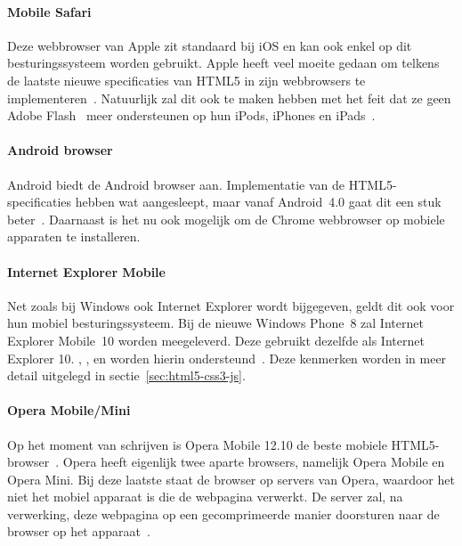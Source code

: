 \paragraph{Mobile Safari}
\label{sec:mobile-safari}
Deze webbrowser van Apple zit standaard bij iOS en kan ook enkel op dit besturingssysteem worden gebruikt. 
Apple heeft veel moeite gedaan om telkens de laatste nieuwe specificaties van HTML5 in zijn webbrowsers te implementeren~\cite{Hales2012}. 
Natuurlijk zal dit ook te maken hebben met het feit dat ze geen Adobe Flash~\cite{Adobe2013} meer ondersteunen op hun iPods, iPhones en iPads~\cite{Jobs2010}.

\paragraph{Android browser}
\label{sec:android-browser}
Android biedt de Android browser aan. 
Implementatie van de HTML5-specificaties hebben wat aangesleept, maar vanaf Android~4.0 gaat dit een stuk beter~\cite{Hales2012}. 
Daarnaast is het nu ook mogelijk om de Chrome webbrowser op mobiele apparaten te installeren.

\paragraph{Internet Explorer Mobile}
Net zoals bij Windows ook Internet Explorer wordt bijgegeven, geldt dit ook voor hun mobiel  besturingssysteem. 
Bij de nieuwe Windows Phone~8 zal Internet Explorer Mobile~10 worden meegeleverd. 
Deze gebruikt dezelfde  als Internet Explorer 10. 
, ,  en  worden hierin ondersteund~\cite{Hales2012}.
Deze kenmerken worden in meer detail uitgelegd in sectie~\ref{sec:html5-css3-js}.

\paragraph{Opera Mobile/Mini}
Op het moment van schrijven is Opera Mobile 12.10 de beste mobiele HTML5-browser~\cite{Sights2012}. 
Opera heeft eigenlijk twee aparte browsers, namelijk Opera Mobile en Opera Mini. 
Bij deze laatste staat de browser  op servers van Opera, waardoor het niet het mobiel apparaat is die de webpagina verwerkt. 
De server zal, na verwerking, deze webpagina op een gecomprimeerde manier doorsturen naar de browser op het apparaat~\cite{PhilDutson2012}.

